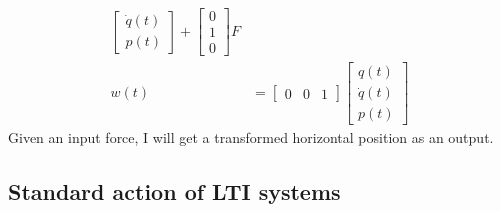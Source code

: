 \begin{example}
\begin{equation*}
\begin{aligned}
\begin{bmatrix}
                                                                            \dot{q}(t) \\
                                                                            {p}(t)
                                                                        \end{bmatrix}+
            \begin{bmatrix}
                0 \\
                1 \\
                0
            \end{bmatrix} F \\
            w(t)                            & =\begin{bmatrix}
                                                   0 & 0 & 1
                                               \end{bmatrix}\begin{bmatrix}
                                                                {q}(t)     \\
                                                                \dot{q}(t) \\
                                                                {p}(t)
                                                            \end{bmatrix}
        \end{aligned}
    \end{equation*}
    Given an input force, I will get a transformed horizontal position as an output.
\end{example}


\subsection{Standard action of LTI systems}

